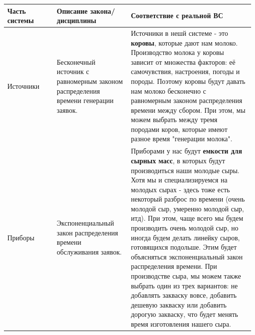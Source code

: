 \documentclass[a4paper, 14pt]{article}
\begin{document}
\begin{center}
	\begin{tabular}{|p{0.2\linewidth} | p{0.3\linewidth}| p{0.5\linewidth}|}
		\hline
		Часть системы      & Описание закона/дисциплины                                                           & Соответствие с реальной ВС                                                                                                                                                                                                                                                                                                                                                                                                                                                                                                                                                                                                                                     \\
		\hline
		Источники          & Бесконечный источник с равномерным законом распределения времени генерации заявок.   & Источники в нешй системе - это \textbf{коровы}, которые дают нам молоко. Производство молока у коровы зависит от множества факторов: её самочувствия, настроения, погоды и породы. Поэтому коровы будут давать нам молоко бесконечно с равномерным законом распределения времени между сбором. При этом, мы можем выбрать между тремя породами коров, которые имеют разное время "генерации молока".                                                                                                                                                                                                                                                           \\
		\hline
		Приборы            & Экспоненциальный закон распределения времени обслуживания заявок.                    & Приборами у нас будут \textbf{емкости для сырных масс}, в которых будут производиться наши молодые сыры. Хотя мы и специализируемся на молодых сырах - здесь тоже есть некоторый разброс по времени (очень молодой сыр, умеренно молодой сыр, итд). При этом, чаще всего мы будем производить очень молодой сыр, но иногда будем делать линейку сыров, готовящихся подольше. Этим будет объясняться экспоненциальный закон распределения времени. При производстве сыра, мы можем также выбрать один из трех вариантов: не добавлять закваску вовсе, добавить дешевую закваску или добавить дорогую закваску, что будет менять время изготовления нашего сыра. \\
		\hline

\end{tabular}
\end{center}
\end{document}
